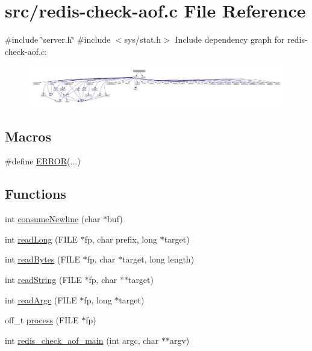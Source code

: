 \hypertarget{redis-check-aof_8c}{}\section{src/redis-\/check-\/aof.c File Reference}
\label{redis-check-aof_8c}
{\ttfamily \#include \char`\"{}server.\+h\char`\"{}}\newline
{\ttfamily \#include $<$sys/stat.\+h$>$}\newline
Include dependency graph for redis-\/check-\/aof.c\+:
\nopagebreak
\begin{figure}[H]
\begin{center}
\leavevmode
\includegraphics[width=350pt]{redis-check-aof_8c__incl}
\end{center}
\end{figure}
\subsection*{Macros}
\begin{DoxyCompactItemize}
\item 
\#define \hyperlink{redis-check-aof_8c_a02ce8a968600d004ba60858425c46307}{E\+R\+R\+OR}(...)
\end{DoxyCompactItemize}
\subsection*{Functions}
\begin{DoxyCompactItemize}
\item 
int \hyperlink{redis-check-aof_8c_ad257fd8e80f1bb36006b6d53d7197f55}{consume\+Newline} (char $\ast$buf)
\item 
int \hyperlink{redis-check-aof_8c_a25d1a2f4b61372995c5ddaa8719f4778}{read\+Long} (F\+I\+LE $\ast$fp, char prefix, long $\ast$target)
\item 
int \hyperlink{redis-check-aof_8c_a93da48750c3c32a24e15ceca70785ef5}{read\+Bytes} (F\+I\+LE $\ast$fp, char $\ast$target, long length)
\item 
int \hyperlink{redis-check-aof_8c_a5ffcae5a68079488c621f58b7a346e97}{read\+String} (F\+I\+LE $\ast$fp, char $\ast$$\ast$target)
\item 
int \hyperlink{redis-check-aof_8c_ad47ad8d006923ece737472043b76baca}{read\+Argc} (F\+I\+LE $\ast$fp, long $\ast$target)
\item 
off\+\_\+t \hyperlink{redis-check-aof_8c_a8cf1106df50e81c2487c1ac7c26119c0}{process} (F\+I\+LE $\ast$fp)
\item 
int \hyperlink{redis-check-aof_8c_a4cf4c173fb3690dd908cd74f72847972}{redis\+\_\+check\+\_\+aof\+\_\+main} (int argc, char $\ast$$\ast$argv)
\end{DoxyCompactItemize}


